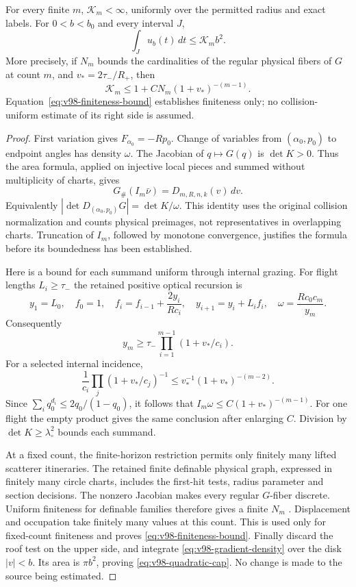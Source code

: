 \begin{lemma}
\label{lem:v98-quadratic-cap}
For every finite $m$, $\mathcal K_m<\infty$, uniformly over the
permitted radius and exact labels. For $0<b<b_0$ and every interval
$J$,
\begin{equation}\label{eq:v98-quadratic-cap}
        \int_J u_b(t)\,dt\le\mathcal K_m b^2.
\end{equation}
More precisely, if $N_m$ bounds the cardinalities of the regular
physical fibers of $G$ at count $m$, and $v_*=2\tau_-/R_+$, then
\begin{equation}\label{eq:v98-finiteness-bound}
 \mathcal K_m\le1+C N_m(1+v_*)^{-(m-1)}.
\end{equation}
Equation~\eqref{eq:v98-finiteness-bound} establishes finiteness only;
no collision-uniform estimate of its right side is assumed.
\end{lemma}
\begin{proof}
First variation gives $F_{\alpha_0}=-Rp_0$. Change of variables from
$(\alpha_0,p_0)$ to endpoint angles has density $\omega$. The
Jacobian of $q\mapsto G(q)$ is $\det K>0$. Thus the area formula,
applied on injective local pieces and summed without multiplicity of
charts, gives
\[
 G_\#(I_m\bar\nu)=D_{m,R,n,k}(v)\,dv.
\]
Equivalently $|\det D_{(\alpha_0,p_0)}G|=\det K/\omega$.
This identity uses the original collision normalization and counts
physical preimages, not representatives in overlapping charts.
Truncation of $I_m$, followed by monotone convergence, justifies the
formula before its boundedness has been established.

Here is a bound for each summand uniform through internal grazing.
For flight lengths $L_i\ge\tau_-$ the retained positive optical
recursion is
\[
 y_1=L_0,\quad f_0=1,\quad
 f_i=f_{i-1}+\frac{2y_i}{Rc_i},\quad
 y_{i+1}=y_i+L_i f_i,\quad
 \omega=\frac{Rc_0c_m}{y_m}.
\]
Consequently
\[
 y_m\ge\tau_-\prod_{i=1}^{m-1}(1+v_*/c_i).
\]
For a selected internal incidence,
\[
 \frac1{c_i}\prod_j(1+v_*/c_j)^{-1}
 \le v_*^{-1}(1+v_*)^{-(m-2)}.
\]
Since $\sum_iq_0^{d_i}\le2q_0/(1-q_0)$, it follows that
$I_m\omega\le C(1+v_*)^{-(m-1)}$. For one flight the empty
product gives the same conclusion after enlarging $C$.
Division by $\det K\ge\lambda_\circ^2$ bounds each summand.

At a fixed count, the finite-horizon restriction permits only finitely
many lifted scatterer itineraries. The retained finite definable
physical graph, expressed in finitely many circle charts, includes
the first-hit tests, radius parameter and section decisions. The
nonzero Jacobian makes every regular $G$-fiber discrete. Uniform
finiteness for definable families therefore gives a finite $N_m$
\cite{Coste}. Displacement and occupation take finitely many values
at this count. This is used only for fixed-count finiteness and proves
\eqref{eq:v98-finiteness-bound}. Finally discard the roof test on the
upper side, and integrate \eqref{eq:v98-gradient-density} over the
disk $|v|<b$. Its area is $\pi b^2$, proving
\eqref{eq:v98-quadratic-cap}. No change is made to the source being
estimated.
\end{proof}

